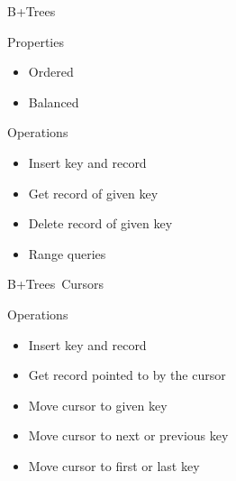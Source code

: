 \documentclass[page number,usenames,dvipsnames]{beamer}
\def\spec#1{{\color{spec}\textbf{#1}}}
\def\prog#1{{\color{prog}\textbf{#1}}}
\def\btrees{B+Trees}
\begin{document}
\begin{frame}{B+Trees}
  \beforeinsert
  \vfill
  \begin{multicols}{2}
    \begin{exampleblock}{Properties}
      \begin{itemize}
      \item Ordered
      \item Balanced
      \end{itemize}
    \end{exampleblock}
      \begin{block}{Operations}
        \begin{itemize}
        \item Insert key and record
        \item Get record of given key
        \item {\color{mDarkRed}Delete record of given key}
        \item Range queries
        \end{itemize}
      \end{block}
  \end{multicols}

\end{frame}


\begin{frame}{\btrees\ Cursors}
  \cursor
  \vfill
  \begin{block}{Operations}
    \begin{itemize}
    \item Insert key and record
    \item Get record pointed to by the cursor
    \item Move cursor to given key
    \item Move cursor to next or previous key
    \item Move cursor to first or last key
    \end{itemize}
  \end{block}
\end{frame}

\newcommand{\hoare}[3]{\{\spec{$#1$}\}~\prog{$#2$}~\{\spec{$#3$}\}}
\end{document}
